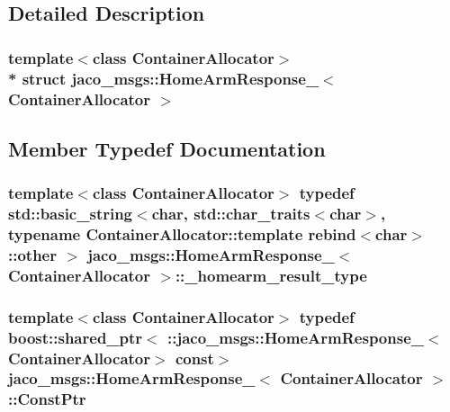\subsection{Detailed Description}
\subsubsection*{template$<$class Container\+Allocator$>$\\*
struct jaco\+\_\+msgs\+::\+Home\+Arm\+Response\+\_\+$<$ Container\+Allocator $>$}



\subsection{Member Typedef Documentation}
\subsubsection[{\texorpdfstring{\+\_\+homearm\+\_\+result\+\_\+type}{_homearm_result_type}}]{\setlength{\rightskip}{0pt plus 5cm}template$<$class Container\+Allocator$>$ typedef std\+::basic\+\_\+string$<$char, std\+::char\+\_\+traits$<$char$>$, typename Container\+Allocator\+::template rebind$<$char$>$\+::other $>$ {\bf jaco\+\_\+msgs\+::\+Home\+Arm\+Response\+\_\+}$<$ Container\+Allocator $>$\+::{\bf \+\_\+homearm\+\_\+result\+\_\+type}}\hypertarget{structjaco__msgs_1_1HomeArmResponse___aca787aa960164fab78282b0f84b6d636}{}\label{structjaco__msgs_1_1HomeArmResponse___aca787aa960164fab78282b0f84b6d636}
\subsubsection[{\texorpdfstring{Const\+Ptr}{ConstPtr}}]{\setlength{\rightskip}{0pt plus 5cm}template$<$class Container\+Allocator$>$ typedef boost\+::shared\+\_\+ptr$<$ \+::{\bf jaco\+\_\+msgs\+::\+Home\+Arm\+Response\+\_\+}$<$Container\+Allocator$>$ const$>$ {\bf jaco\+\_\+msgs\+::\+Home\+Arm\+Response\+\_\+}$<$ Container\+Allocator $>$\+::{\bf Const\+Ptr}}\hypertarget{structjaco__msgs_1_1HomeArmResponse___a3ea69e441416b51b1be0a08085a75de9}{}\label{structjaco__msgs_1_1HomeArmResponse___a3ea69e441416b51b1be0a08085a75de9}
